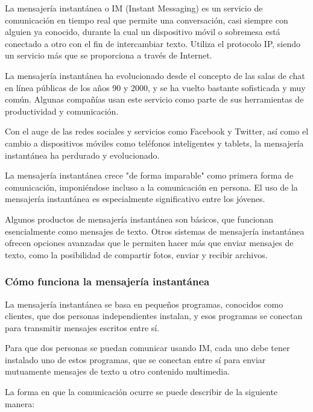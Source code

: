 La mensajería instantánea o IM (Instant Messaging) es un servicio de comunicación en tiempo real que permite una conversación, casi siempre con alguien ya conocido, durante la cual un dispositivo móvil o sobremesa está conectado a otro con el fin de intercambiar texto. Utiliza el protocolo IP, siendo un servicio más que se proporciona a través de Internet.

La mensajería instantánea ha evolucionado desde el concepto de las salas de chat en línea públicas de los años 90 y 2000, y se ha vuelto bastante sofisticada y muy común. Algunas compañías usan este servicio como parte de sus herramientas de productividad y comunicación.

Con el auge de las redes sociales y servicios como Facebook y Twitter, así como el cambio a dispositivos móviles como teléfonos inteligentes y tablets, la mensajería instantánea ha perdurado y evolucionado.

La mensajería instantánea crece "de forma imparable" como primera forma de comunicación, imponiéndose incluso a la comunicación en persona. El uso de la mensajería instantánea es especialmente significativo entre los jóvenes.

Algunos productos de mensajería instantánea son básicos, que funcionan esencialmente como mensajes de texto. Otros sistemas de mensajería instantánea ofrecen opciones avanzadas que le permiten hacer más que enviar mensajes de texto, como la posibilidad de compartir fotos, enviar y recibir archivos.

\subsubsection{Cómo funciona la mensajería instantánea}

La mensajería instantánea se basa en pequeños programas, conocidos como clientes, que dos personas independientes instalan, y esos programas se conectan para transmitir mensajes escritos entre sí.

Para que dos personas se puedan comunicar usando IM, cada uno debe tener instalado uno de estos programas, que se conectan entre sí para enviar mutuamente mensajes de texto u otro contenido multimedia.

La forma en que la comunicación ocurre se puede describir de la siguiente manera:

